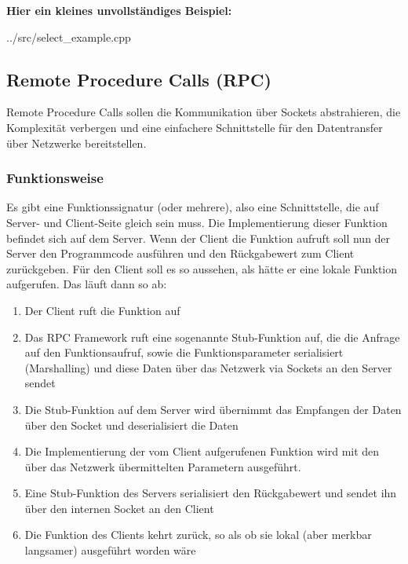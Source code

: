 \textbf{Hier ein kleines unvollständiges Beispiel:}\\

\begin{lstinputlisting}[language=C++]
    {../src/select_example.cpp}
\end{lstinputlisting}
\newpage

\subsection{Remote Procedure Calls (RPC)}

Remote Procedure Calls sollen die Kommunikation über Sockets abstrahieren, die Komplexität verbergen und eine einfachere Schnittstelle für den Datentransfer über Netzwerke bereitstellen.
\subsubsection{Funktionsweise}
Es gibt eine Funktionssignatur (oder mehrere), also eine Schnittstelle, die auf Server- und Client-Seite gleich sein muss. Die Implementierung dieser Funktion befindet sich auf dem Server. Wenn der Client die Funktion aufruft soll nun der Server den Programmcode ausführen und den Rückgabewert zum Client zurückgeben. Für den Client soll es so aussehen, als hätte er eine lokale Funktion aufgerufen. Das läuft dann so ab:
\begin{enumerate}
    \item Der Client ruft die Funktion auf
    \item Das RPC Framework ruft eine sogenannte Stub-Funktion auf, die die Anfrage auf den Funktionsaufruf, sowie die Funktionsparameter serialisiert (Marshalling) und diese Daten über das Netzwerk via Sockets an den Server sendet
    \item Die Stub-Funktion auf dem Server wird übernimmt das Empfangen der Daten über den Socket und deserialisiert die Daten
    \item Die Implementierung der vom Client aufgerufenen Funktion wird mit den über das Netzwerk übermittelten Parametern ausgeführt.
    \item Eine Stub-Funktion des Servers serialisiert den Rückgabewert und sendet ihn über den internen Socket an den Client
    \item Die Funktion des Clients kehrt zurück, so als ob sie lokal (aber merkbar langsamer) ausgeführt worden wäre
\end{enumerate}

